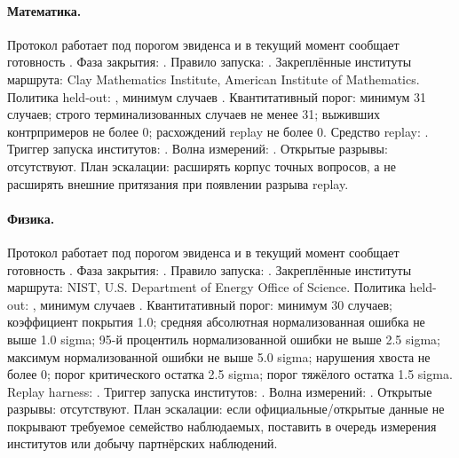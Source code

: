 \paragraph{Математика.}
Протокол  работает под порогом эвиденса  и в текущий момент сообщает готовность .
Фаза закрытия: . Правило запуска: .
Закреплённые институты маршрута: Clay Mathematics Institute, \allowbreak American Institute of Mathematics.
Политика held-out: , минимум случаев .
Квантитативный порог: минимум 31 случаев; строго терминализованных случаев не менее 31; выживших контрпримеров не более 0; расхождений replay не более 0.
Средство replay: .
Триггер запуска институтов: . Волна измерений: .
Открытые разрывы: отсутствуют.
План эскалации: расширять корпус точных вопросов, а не расширять внешние притязания при появлении разрыва replay.

\paragraph{Физика.}
Протокол  работает под порогом эвиденса  и в текущий момент сообщает готовность .
Фаза закрытия: . Правило запуска: .
Закреплённые институты маршрута: NIST, \allowbreak U.S. Department of Energy Office of Science.
Политика held-out: , минимум случаев .
Квантитативный порог: минимум 30 случаев; коэффициент покрытия 1.0; средняя абсолютная нормализованная ошибка не выше 1.0 sigma; 95-й процентиль нормализованной ошибки не выше 2.5 sigma; максимум нормализованной ошибки не выше 5.0 sigma; нарушения хвоста не более 0; порог критического остатка 2.5 sigma; порог тяжёлого остатка 1.5 sigma.
Replay harness: .
Триггер запуска институтов: . Волна измерений: .
Открытые разрывы: отсутствуют.
План эскалации: если официальные/открытые данные не покрывают требуемое семейство наблюдаемых, поставить в очередь измерения институтов или добычу партнёрских наблюдений.

